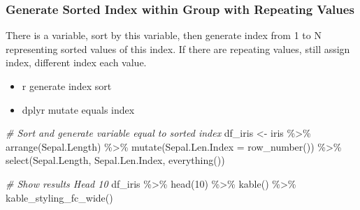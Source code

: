 \documentclass[
]{book}
\newenvironment{Shaded}{\begin{snugshade}}{\end{snugshade}}
\newcommand{\AttributeTok}[1]{\textcolor[rgb]{0.77,0.63,0.00}{#1}}
\newcommand{\CommentTok}[1]{\textcolor[rgb]{0.56,0.35,0.01}{\textit{#1}}}
\newcommand{\DecValTok}[1]{\textcolor[rgb]{0.00,0.00,0.81}{#1}}
\newcommand{\FunctionTok}[1]{\textcolor[rgb]{0.00,0.00,0.00}{#1}}
\newcommand{\NormalTok}[1]{#1}
\newcommand{\OtherTok}[1]{\textcolor[rgb]{0.56,0.35,0.01}{#1}}
\newcommand{\SpecialCharTok}[1]{\textcolor[rgb]{0.00,0.00,0.00}{#1}}
\providecommand{\tightlist}{%
  \setlength{\itemsep}{0pt}\setlength{\parskip}{0pt}}
\begin{document}
\hypertarget{generate-sorted-index-within-group-with-repeating-values}{%
\subsubsection{Generate Sorted Index within Group with Repeating Values}\label{generate-sorted-index-within-group-with-repeating-values}}

There is a variable, sort by this variable, then generate index from 1 to N representing sorted values of this index. If there are repeating values, still assign index, different index each value.

\begin{itemize}
\tightlist
\item
  r generate index sort
\item
  dplyr mutate equals index
\end{itemize}

\begin{Shaded}
\begin{Highlighting}[]
\CommentTok{\# Sort and generate variable equal to sorted index}
\NormalTok{df\_iris }\OtherTok{\textless{}{-}}\NormalTok{ iris }\SpecialCharTok{\%\textgreater{}\%} \FunctionTok{arrange}\NormalTok{(Sepal.Length) }\SpecialCharTok{\%\textgreater{}\%}
              \FunctionTok{mutate}\NormalTok{(}\AttributeTok{Sepal.Len.Index =} \FunctionTok{row\_number}\NormalTok{()) }\SpecialCharTok{\%\textgreater{}\%}
              \FunctionTok{select}\NormalTok{(Sepal.Length, Sepal.Len.Index, }\FunctionTok{everything}\NormalTok{())}

\CommentTok{\# Show results Head 10}
\NormalTok{df\_iris }\SpecialCharTok{\%\textgreater{}\%} \FunctionTok{head}\NormalTok{(}\DecValTok{10}\NormalTok{) }\SpecialCharTok{\%\textgreater{}\%}
  \FunctionTok{kable}\NormalTok{() }\SpecialCharTok{\%\textgreater{}\%}
  \FunctionTok{kable\_styling\_fc\_wide}\NormalTok{()}
\end{Highlighting}
\end{Shaded}
\end{document}
